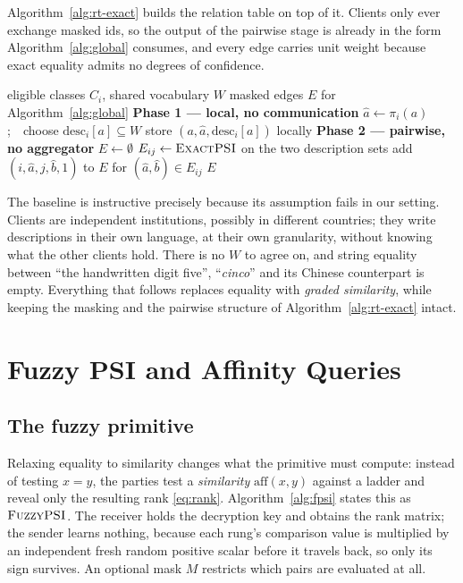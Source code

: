 \documentclass[conference]{IEEEtran}
\newcommand{\ExactPSI}{\textsc{ExactPSI}}
\newcommand{\FuzzyPSI}{\textsc{FuzzyPSI}}
\newcommand{\aff}{\mathrm{aff}}
\begin{document}
Algorithm~\ref{alg:rt-exact} builds the relation table on top of it.
Clients only ever exchange masked ids, so the output of the pairwise
stage is already in the form Algorithm~\ref{alg:global} consumes, and
every edge carries unit weight because exact equality admits no degrees
of confidence.

\begin{algorithm}[t]
\caption{Relation table via exact PSI}
\label{alg:rt-exact}
\begin{algorithmic}[1]
\Require eligible classes $C_i$, shared vocabulary $W$
\Ensure masked edges $E$ for Algorithm~\ref{alg:global}
  \Statex \textbf{Phase 1 --- local, no communication}
    \State $\hat a\gets\pi_i(a)$;\ \ choose $\mathrm{desc}_i[a]\subseteq W$
    \State store $(a,\hat a,\mathrm{desc}_i[a])$ locally
  \EndFor
  \Statex \textbf{Phase 2 --- pairwise, no aggregator}
  \State $E\gets\emptyset$
    \State $E_{ij}\gets\ExactPSI$ on the two description sets
    \State add $(i,\hat a,j,\hat b,1)$ to $E$ for $(\hat a,\hat b)\in E_{ij}$
  \EndFor
  \State \Return $E$
\end{algorithmic}
\end{algorithm}

The baseline is instructive precisely because its assumption fails in
our setting. Clients are independent institutions, possibly in different
countries; they write descriptions in their own language, at their own
granularity, without knowing what the other clients hold. There is no
$W$ to agree on, and string equality between ``the handwritten digit
five'', ``\emph{cinco}'' and its Chinese counterpart is
empty. Everything that follows replaces equality with \emph{graded
similarity}, while keeping the masking and the pairwise structure of
Algorithm~\ref{alg:rt-exact} intact.

\section{Fuzzy PSI and Affinity Queries}
\label{sec:fuzzy}

\subsection{The fuzzy primitive}
Relaxing equality to similarity changes what the primitive must compute:
instead of testing $x=y$, the parties test a \emph{similarity}
$\aff(x,y)$ against a ladder and reveal only the resulting rank
\eqref{eq:rank}. Algorithm~\ref{alg:fpsi} states this as
$\FuzzyPSI$. The receiver holds the decryption key and obtains the rank
matrix; the sender learns nothing, because each rung's comparison value
is multiplied by an independent fresh random positive scalar before it
travels back, so only its sign survives. An optional mask $M$ restricts
which pairs are evaluated at all.
\end{document}
